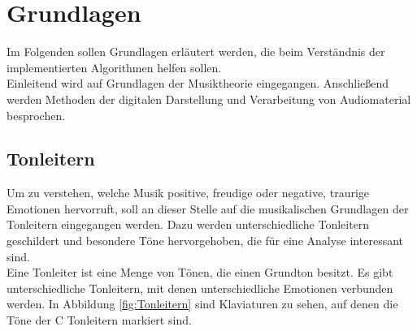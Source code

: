 \documentclass[11pt,a4paper]{article}
\begin{document}
\newpage
\section{Grundlagen}
Im Folgenden sollen Grundlagen erläutert werden, die beim Verständnis der implementierten Algorithmen helfen sollen.\\
Einleitend wird auf Grundlagen der Musiktheorie eingegangen. Anschließend werden Methoden der digitalen Darstellung und Verarbeitung von Audiomaterial besprochen.

\subsection{Tonleitern}
\label{sec:Tonleitern}
Um zu verstehen, welche Musik positive, freudige  oder negative, traurige Emotionen hervorruft, soll an dieser Stelle auf die musikalischen Grundlagen der Tonleitern eingegangen werden. Dazu werden unterschiedliche Tonleitern geschildert und besondere Töne hervorgehoben, die für eine Analyse interessant sind.\\
Eine Tonleiter ist eine Menge von Tönen, die einen Grundton besitzt. Es gibt unterschiedliche Tonleitern, mit denen unterschiedliche Emotionen verbunden werden. In Abbildung \ref{fig:Tonleitern} sind Klaviaturen zu sehen, auf denen die Töne der C Tonleitern markiert sind.
\end{document}

